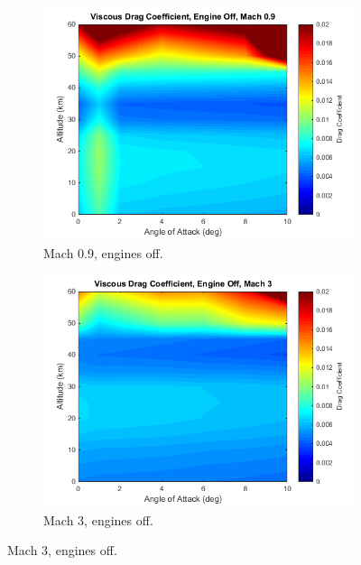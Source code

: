 		
		\begin{figure}
			\begin{subfigure}{.5\textwidth}
				\centering
				\includegraphics[width=0.99\linewidth]{figures/3_vehicle_design/ViscousCd1}
				\caption{Mach 0.9, engines off.}
			\end{subfigure}
			\begin{subfigure}{.5\textwidth}
				\centering
				\includegraphics[width=0.99\linewidth]{figures/3_vehicle_design/ViscousCd2}
				\caption{Mach 3, engines off.}
				

\end{subfigure}
\end{figure}
